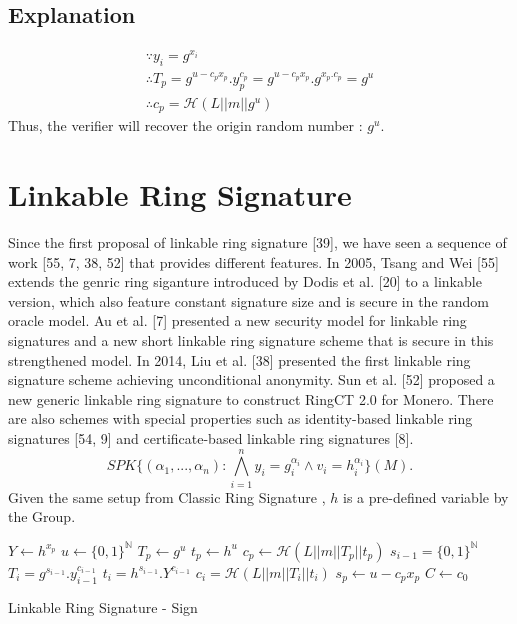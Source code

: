 \documentclass[11pt]{article}
\begin{document}
\subsection{Explanation}
\begin{gather*}
\because y_i = g^{x_i} \\
\therefore T_p = g^{u-c_{p}x_{p}} . y_{p}^{c_p} = g^{u-c_{p}x_{p}} . g^{x_p.c_p} = g^u \\
\therefore c_p = \mathcal{H}(L || m || g^u)
\end{gather*}
Thus, the verifier will recover the origin random number : $g^u$.

\section{Linkable Ring Signature}
Since the first proposal of linkable ring signature [39], we have seen a sequence of work [55, 7, 38, 52] that provides different features. In 2005, Tsang and Wei [55] extends the genric ring siganture introduced by Dodis et al. [20] to a linkable version, which also feature constant signature size and is secure in the random oracle model. Au et al. [7] presented a new security model for linkable ring signatures and a new short linkable ring signature scheme that is secure in this strengthened model. In 2014, Liu et al.
[38] presented the first linkable ring signature scheme achieving unconditional anonymity. Sun et al. [52] proposed a new generic linkable ring signature to construct RingCT 2.0 for Monero. There are also schemes with special properties such as identity-based linkable ring signatures [54, 9] and certificate-based linkable ring signatures [8].
\newline
\begin{equation}
SPK\{(\alpha_1,...,\alpha_n) : \bigwedge_{i=1}^{n}{y_i = g_i^{\alpha_i} \wedge v_i = h_i^{\alpha_i}}\}(M).
\end{equation}
\newline
Given the same setup from Classic Ring Signature , $h$ is a pre-defined variable by the Group.

\begin{algorithm}
\DontPrintSemicolon
{}
$Y \gets h^{x_p}$\;
$u \gets \{0, 1\}^\mathbb{N}$\;
$T_p \gets g^u$\;
$t_p \gets h^u$\;
$ c_p \gets \mathcal{H}(L || m || T_p || t_p) $\;
 {
  $s_{i-1} = \{0,1\}^\mathbb{N}$\;
  $T_i = g^{s_{i-1}} . y_{i-1}^{c_{i-1}}$\;
  $t_i = h^{s_{i-1}} . Y^{c_{i-1}}$\;
  $c_i = \mathcal{H}(L || m || T_i || t_i)$\;
}
$s_p \gets u - c_{p}{x_p}$\;
$C \gets c_0$\;
\;
\caption{Linkable Ring Signature - Sign}
\label{algo:linkable-sign}
\end{algorithm}
\end{document}

